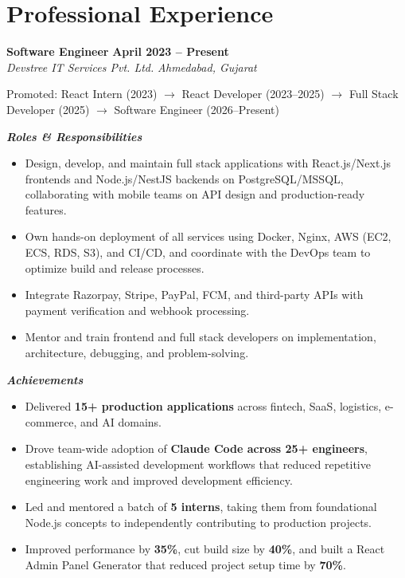 \documentclass[letterpaper,10pt]{article}
\newcommand{\resumeSubheading}[4]{%
    \textbf{#1} \hfill \textbf{#2}\\
    \textit{#3} \hfill \textit{#4}\par
}
\newcommand{\subLabel}[1]{%
    \vspace{2pt}\textbf{\textit{#1}}\par
}
\begin{document}

\section{Professional Experience}

\resumeSubheading
    {Software Engineer}
    {April 2023 -- Present}
    {Devstree IT Services Pvt. Ltd.}
    {Ahmedabad, Gujarat}
{\small Promoted: React Intern (2023) $\rightarrow$ React Developer (2023--2025) $\rightarrow$ Full Stack Developer (2025) $\rightarrow$ Software Engineer (2026--Present)}\par

\subLabel{Roles \& Responsibilities}
\begin{itemize}
    \item Design, develop, and maintain full stack applications with React.js/Next.js frontends and Node.js/NestJS backends on PostgreSQL/MSSQL, collaborating with mobile teams on API design and production-ready features.
    \item Own hands-on deployment of all services using Docker, Nginx, AWS (EC2, ECS, RDS, S3), and CI/CD, and coordinate with the DevOps team to optimize build and release processes.
    \item Integrate Razorpay, Stripe, PayPal, FCM, and third-party APIs with payment verification and webhook processing.
    \item Mentor and train frontend and full stack developers on implementation, architecture, debugging, and problem-solving.
\end{itemize}

\subLabel{Achievements}
\begin{itemize}
    \item Delivered \textbf{15+ production applications} across fintech, SaaS, logistics, e-commerce, and AI domains.
    \item Drove team-wide adoption of \textbf{Claude Code across 25+ engineers}, establishing AI-assisted development workflows that reduced repetitive engineering work and improved development efficiency.
    \item Led and mentored a batch of \textbf{5 interns}, taking them from foundational Node.js concepts to independently contributing to production projects.
    \item Improved performance by \textbf{35\%}, cut build size by \textbf{40\%}, and built a React Admin Panel Generator that reduced project setup time by \textbf{70\%}.
\end{itemize}
\end{document}
